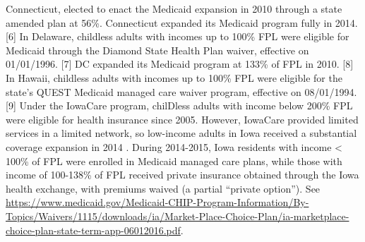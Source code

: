 \documentclass[12pt]{article}%
\begin{document}
\begin{appendices}
\begin{table}[]
\begin{scriptsize}
\begin{justify}
[5] Connecticut, elected to enact the Medicaid expansion in 2010 through a state amended plan at 56\%. Connecticut expanded its Medicaid program fully in 2014.  
[6] In Delaware, childless adults with incomes up to 100\% FPL were eligible for Medicaid through the Diamond State Health Plan waiver, effective on 01/01/1996.
[7] DC expanded its Medicaid program at 133\% of FPL in 2010.
[8] In Hawaii, childless adults with incomes up to 100\% FPL were eligible for the state’s QUEST Medicaid managed care waiver program, effective on 08/01/1994.
[9] Under the IowaCare program, chilDless adults with income below 200\% FPL were eligible for health insurance since 2005. However, IowaCare provided limited services in a limited network, so low-income adults in Iowa received a substantial coverage expansion in 2014 \citep{alma9983557296402771}. 
During 2014-2015, Iowa residents with income < 100\% of FPL were enrolled in Medicaid managed care plans, while those with income of 100-138\% of FPL received private insurance obtained through the Iowa health exchange, with premiums waived (a partial ``private option'').  See \url{https://www.medicaid.gov/Medicaid-CHIP-Program-Information/By-Topics/Waivers/1115/downloads/ia/Market-Place-Choice-Plan/ia-marketplace-choice-plan-state-term-app-06012016.pdf}. 
\end{justify}
 \end{scriptsize}
\end{table}



\end{appendices}
\end{document}
